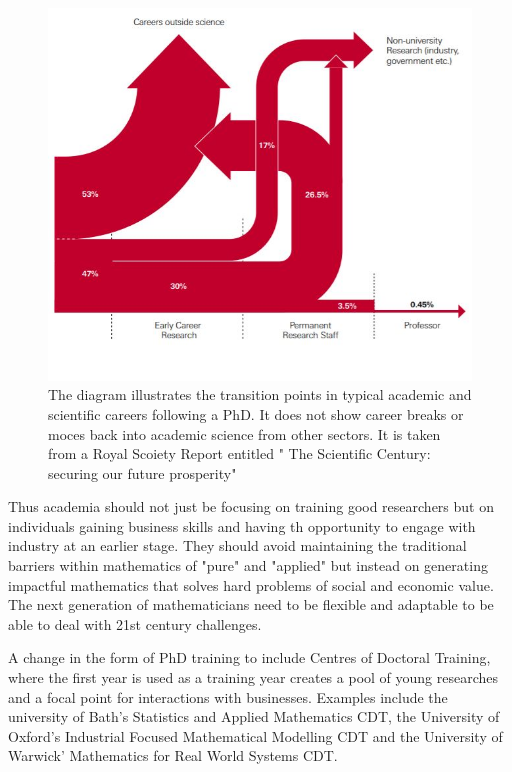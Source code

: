 \documentclass[11pt]{article} %
\begin{document}
\begin{figure}
	\centering
	\includegraphics[width=0.9\linewidth]{"Report_images/phd career paths"}
	\caption{The diagram illustrates the transition points in typical academic and scientific careers following a PhD. It does not show career breaks or moces back into academic science from other sectors. It is taken from a Royal Scoiety Report entitled " The Scientific Century: securing our future prosperity" \cite{royalsoc2010}}
	\label{fig:phd-career-paths}
\end{figure}

Thus academia should not just be focusing on training good researchers but on individuals gaining business skills and having th opportunity to engage with industry at an earlier stage. They should avoid maintaining the traditional barriers within mathematics of "pure" and "applied" but instead on  generating impactful mathematics that solves hard problems of social and economic value. The next generation of mathematicians need to be flexible and adaptable to be  able to deal with 21st century challenges.

A change in the form of PhD training to include Centres of Doctoral Training, where the first year is used as a training year  creates a pool of young researches and a focal point for interactions with businesses. Examples include the university of Bath's Statistics and Applied Mathematics CDT, the University of Oxford's Industrial Focused Mathematical Modelling CDT and the University of Warwick'  Mathematics for Real World Systems CDT. 
\end{document}
